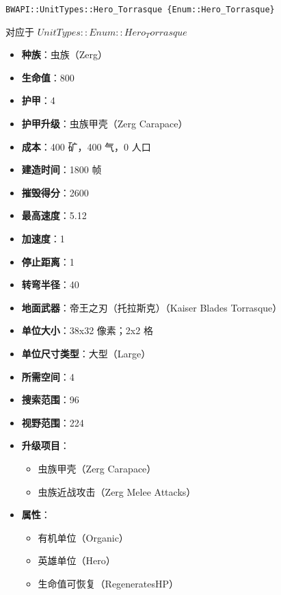 \begin{tcolorbox}[colback=white, colframe=black!60!white, title=Hero\_Torrasque(), arc=0mm]
    \begin{verbatim}
BWAPI::UnitTypes::Hero_Torrasque {Enum::Hero_Torrasque}
    \end{verbatim}
    对应于  $ UnitTypes::Enum::Hero_Torrasque $ 
    \begin{itemize}
        \item \textbf{种族}：虫族（Zerg）
        \item \textbf{生命值}：800
        \item \textbf{护甲}：4
        \item \textbf{护甲升级}：虫族甲壳（Zerg Carapace）
        \item \textbf{成本}：400 矿，400 气，0 人口
        \item \textbf{建造时间}：1800 帧
        \item \textbf{摧毁得分}：2600
        \item \textbf{最高速度}：5.12
        \item \textbf{加速度}：1
        \item \textbf{停止距离}：1
        \item \textbf{转弯半径}：40
        \item \textbf{地面武器}：帝王之刃（托拉斯克）（Kaiser Blades Torrasque）
        \item \textbf{单位大小}：38x32 像素；2x2 格
        \item \textbf{单位尺寸类型}：大型（Large）
        \item \textbf{所需空间}：4
        \item \textbf{搜索范围}：96
        \item \textbf{视野范围}：224
        \item \textbf{升级项目}：
            \begin{itemize}
                \item 虫族甲壳（Zerg Carapace）
                \item 虫族近战攻击（Zerg Melee Attacks）
            \end{itemize}
        \item \textbf{属性}：
            \begin{itemize}
                \item 有机单位（Organic）
                \item 英雄单位（Hero）
                \item 生命值可恢复（RegeneratesHP）
            \end{itemize}
    \end{itemize}
\end{tcolorbox}


